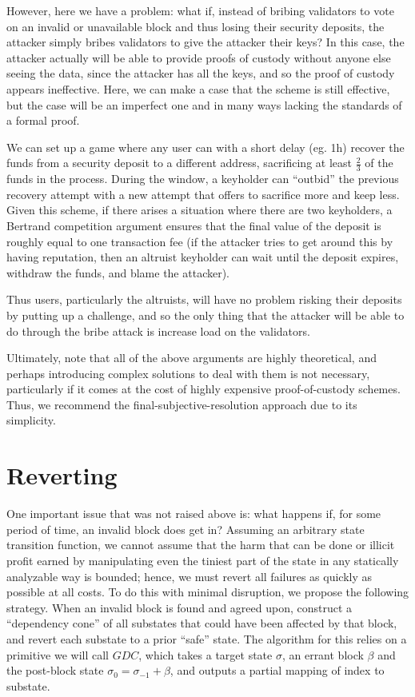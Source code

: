 \documentclass[11pt,a4paper]{report}
\theoremstyle{plain}
\theoremstyle{definition}
\theoremstyle{remark}
\begin{document}
However, here we have a problem: what if, instead of bribing validators to vote on an invalid or unavailable block and thus losing their security deposits, the attacker simply bribes validators to give the attacker their keys? In this case, the attacker actually will be able to provide proofs of custody without anyone else seeing the data, since the attacker has all the keys, and so the proof of custody appears ineffective. Here, we can make a case that the scheme is still effective, but the case will be an imperfect one and in many ways lacking the standards of a formal proof.

We can set up a game where any user can with a short delay (eg. 1h) recover the funds from a security deposit to a different address, sacrificing at least $\frac{2}{3}$ of the funds in the process. During the window, a keyholder can ``outbid'' the previous recovery attempt with a new attempt that offers to sacrifice more and keep less. Given this scheme, if there arises a situation where there are two keyholders, a Bertrand competition argument ensures that the final value of the deposit is roughly equal to one transaction fee (if the attacker tries to get around this by having reputation, then an altruist keyholder can wait until the deposit expires, withdraw the funds, and blame the attacker).

Thus users, particularly the altruists, will have no problem risking their deposits by putting up a challenge, and so the only thing that the attacker will be able to do through the bribe attack is increase load on the validators.

Ultimately, note that all of the above arguments are highly theoretical, and perhaps introducing complex solutions to deal with them is not necessary, particularly if it comes at the cost of highly expensive proof-of-custody schemes. Thus, we recommend the final-subjective-resolution approach due to its simplicity.

\chapter{Reverting}

One important issue that was not raised above is: what happens if, for some period of time, an invalid block does get in? Assuming an arbitrary state transition function, we cannot assume that the harm that can be done or illicit profit earned by manipulating even the tiniest part of the state in any statically analyzable way is bounded; hence, we must revert all failures as quickly as possible at all costs. To do this with minimal disruption, we propose the following strategy. When an invalid block is found and agreed upon, construct a ``dependency cone'' of all substates that could have been affected by that block, and revert each substate to a prior ``safe'' state. The algorithm for this relies on a primitive we will call $GDC$, which takes a target state $\sigma$, an errant block $\beta$ and the post-block state $\sigma_0 = \sigma_{-1} + \beta$, and outputs a partial mapping of index to substate.
\end{document}

